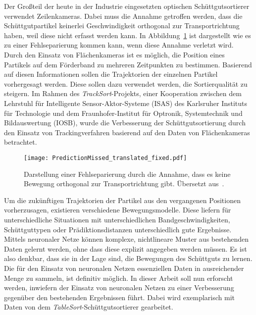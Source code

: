 
Der Großteil der heute in der Industrie eingesetzten optischen Schüttgutsortierer verwendet Zeilenkameras.
Dabei muss die Annahme getroffen werden, dass die Schüttgutpartikel keinerlei Geschwindigkeit orthogonal zur Transportrichtung haben,
weil diese nicht erfasst werden kann.
In Abbildung~\ref{fig:predMissed} ist dargestellt wie es zu einer Fehlseparierung kommen kann, wenn diese Annahme verletzt wird. \\
Durch den Einsatz von Flächenkameras ist es möglich, die Position eines Partikels auf dem Förderband zu mehreren Zeitpunkten zu bestimmen.
Basierend auf diesen Informationen sollen die Trajektorien der einzelnen Partikel vorhergesagt werden.
Diese sollen dazu verwendet werden, die Sortierqualität zu steigern. 
Im Rahmen des \textit{TrackSort}-Projekts, 
einer Kooperation zwischen dem Lehrstuhl für Intelligente Sensor-Aktor-Systeme (ISAS) des Karlsruher Instituts für Technologie
und dem Fraunhofer-Institut für Optronik, Systemtechnik und Bildauswertung (IOSB), 
wurde die Verbesserung der Schüttgutsortierung durch den Einsatz von Trackingverfahren basierend auf den Daten von Flächenkameras betrachtet.

\begin{figure}[h]
    \centering
    \texttt{[image: PredictionMissed\_translated\_fixed.pdf]}
    \caption[Darstellung einer Fehlseparierung basierend auf den Limitationen der Zeilenkamera. Übersetzt aus~~\cite{Pfaff2018}]
    {Darstellung einer Fehlseparierung durch die Annahme, dass es keine Bewegung orthogonal zur Transportrichtung gibt. 
    Übersetzt aus~\cite{Pfaff2018}.}
    \label{fig:predMissed}
\end{figure}


Um die zukünftigen Trajektorien der Partikel aus den vergangenen Positionen vorherzusagen, existieren verschiedene Bewegungsmodelle.
Diese liefern für unterschiedliche Situationen mit unterschiedlichen Bandgeschwindigkeiten, Schüttguttypen oder Prädiktionsdistanzen unterschiedlich gute Ergebnisse.  
Mittels neuronaler Netze können komplexe, nichtlineare Muster aus bestehenden Daten gelernt werden, ohne dass diese explizit angegeben werden müssen.
Es ist also denkbar, dass sie in der Lage sind, die Bewegungen des Schüttguts zu lernen.
Die für den Einsatz von neuronalen Netzen essenziellen Daten in ausreichender Menge zu sammeln, ist definitiv möglich. 
In dieser Arbeit soll nun erforscht werden, inwiefern der Einsatz von neuronalen Netzen zu einer Verbesserung gegenüber den bestehenden Ergebnissen führt.
Dabei wird exemplarisch mit Daten von dem \textit{TableSort}-Schüttgutsortierer gearbeitet.

